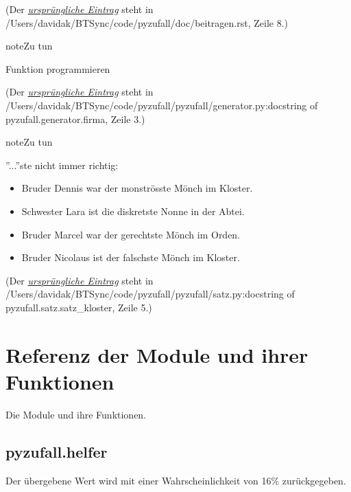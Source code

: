 \documentclass[a4paper,12pt,oneside]{sphinxmanual}
\begin{document}
(Der {\hyperref[beitragen:index-0]{\emph{ursprüngliche Eintrag}}} steht in /Users/davidak/BTSync/code/pyzufall/doc/beitragen.rst, Zeile 8.)

\begin{notice}{note}{Zu tun}

Funktion programmieren
\end{notice}

(Der {\hyperref[module:index-0]{\emph{ursprüngliche Eintrag}}} steht in /Users/davidak/BTSync/code/pyzufall/pyzufall/generator.py:docstring of pyzufall.generator.firma, Zeile 3.)

\begin{notice}{note}{Zu tun}

''...''ste nicht immer richtig:
\begin{itemize}
\item {} 
Bruder Dennis war der monströsste Mönch im Kloster.

\item {} 
Schwester Lara ist die diskretste Nonne in der Abtei.

\item {} 
Bruder Marcel war der gerechtste Mönch im Orden.

\item {} 
Bruder Nicolaus ist der falschste Mönch im Kloster.

\end{itemize}
\end{notice}

(Der {\hyperref[module:index-1]{\emph{ursprüngliche Eintrag}}} steht in /Users/davidak/BTSync/code/pyzufall/pyzufall/satz.py:docstring of pyzufall.satz.satz\_kloster, Zeile 5.)


\chapter{Referenz der Module und ihrer Funktionen}
\label{module::doc}\label{module:referenz-der-module-und-ihrer-funktionen}
Die Module und ihre Funktionen.


\section{pyzufall.helfer}
\label{module:pyzufall-helfer}\label{module:module-pyzufall.helfer}

\begin{fulllineitems}
\label{module:pyzufall.helfer.e16}
Der übergebene Wert wird mit einer Wahrscheinlichkeit von 16\% zurückgegeben.

\end{fulllineitems}
\end{document}
